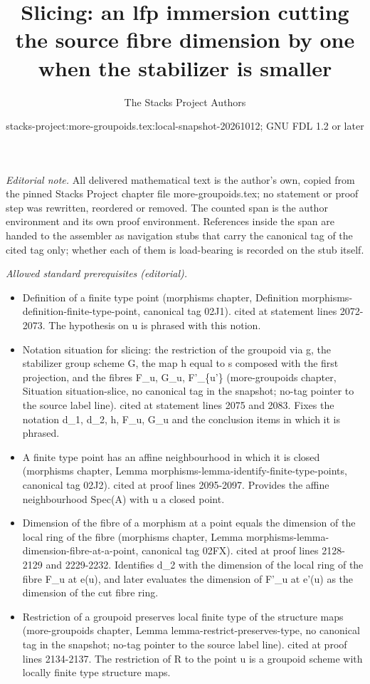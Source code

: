 \documentclass{stacks-project}
\title{Slicing: an lfp immersion cutting the source fibre dimension by one when the stabilizer is smaller}
\author{The Stacks Project Authors}
\date{stacks-project:more-groupoids.tex:local-snapshot-20261012; GNU FDL 1.2 or later}
\theoremstyle{plain}
\theoremstyle{definition}
\theoremstyle{remark}
\numberwithin{equation}{subsection}
\begin{document}
\maketitle
\setcounter{subsection}{1}
\noindent\textit{Editorial note.} All delivered mathematical text is the author's own, copied from the pinned Stacks Project chapter file more-groupoids.tex; no statement or proof step was rewritten, reordered or removed. The counted span is the author environment and its own proof environment. References inside the span are handed to the assembler as navigation stubs that carry the canonical tag of the cited tag only; whether each of them is load-bearing is recorded on the stub itself.\par\medskip
\noindent\textit{Allowed standard prerequisites (editorial).}\begin{itemize}
\item Definition of a finite type point (morphisms chapter, Definition morphisms-definition-finite-type-point, canonical tag 02J1). cited at statement lines 2072-2073. The hypothesis on u is phrased with this notion.
\item Notation situation for slicing: the restriction of the groupoid via g, the stabilizer group scheme G, the map h equal to s composed with the first projection, and the fibres F\_u, G\_u, F'\_\{u'\} (more-groupoids chapter, Situation situation-slice, no canonical tag in the snapshot; no-tag pointer to the source label line). cited at statement lines 2075 and 2083. Fixes the notation d\_1, d\_2, h, F\_u, G\_u and the conclusion items in which it is phrased.
\item A finite type point has an affine neighbourhood in which it is closed (morphisms chapter, Lemma morphisms-lemma-identify-finite-type-points, canonical tag 02J2). cited at proof lines 2095-2097. Provides the affine neighbourhood Spec(A) with u a closed point.
\item Dimension of the fibre of a morphism at a point equals the dimension of the local ring of the fibre (morphisms chapter, Lemma morphisms-lemma-dimension-fibre-at-a-point, canonical tag 02FX). cited at proof lines 2128-2129 and 2229-2232. Identifies d\_2 with the dimension of the local ring of the fibre F\_u at e(u), and later evaluates the dimension of F'\_u at e'(u) as the dimension of the cut fibre ring.
\item Restriction of a groupoid preserves local finite type of the structure maps (more-groupoids chapter, Lemma lemma-restrict-preserves-type, no canonical tag in the snapshot; no-tag pointer to the source label line). cited at proof lines 2134-2137. The restriction of R to the point u is a groupoid scheme with locally finite type structure maps.

\end{itemize}
\end{document}
